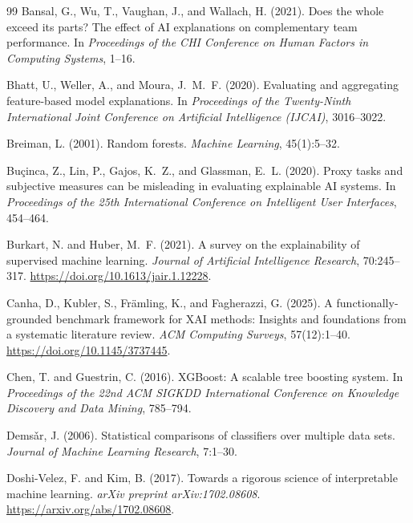 \documentclass[10pt]{article}
\begin{document}
\begin{thebibliography}{99}
Bansal, G., Wu, T., Vaughan, J., and Wallach, H. (2021).
Does the whole exceed its parts? The effect of AI explanations on
complementary team performance.
In \emph{Proceedings of the CHI Conference on Human Factors in Computing
Systems}, 1--16.

Bhatt, U., Weller, A., and Moura, J.~M.~F. (2020).
Evaluating and aggregating feature-based model explanations.
In \emph{Proceedings of the Twenty-Ninth International Joint Conference on
Artificial Intelligence (IJCAI)}, 3016--3022.

Breiman, L. (2001).
Random forests.
\emph{Machine Learning}, 45(1):5--32.

Bu\c{c}inca, Z., Lin, P., Gajos, K.~Z., and Glassman, E.~L. (2020).
Proxy tasks and subjective measures can be misleading in evaluating
explainable AI systems.
In \emph{Proceedings of the 25th International Conference on Intelligent
User Interfaces}, 454--464.

Burkart, N. and Huber, M.~F. (2021).
A survey on the explainability of supervised machine learning.
\emph{Journal of Artificial Intelligence Research}, 70:245--317.
\url{https://doi.org/10.1613/jair.1.12228}.

Canha, D., Kubler, S., Fr\"{a}mling, K., and Fagherazzi, G. (2025).
A functionally-grounded benchmark framework for XAI methods: Insights
and foundations from a systematic literature review.
\emph{ACM Computing Surveys}, 57(12):1--40.
\url{https://doi.org/10.1145/3737445}.

Chen, T. and Guestrin, C. (2016).
XGBoost: A scalable tree boosting system.
In \emph{Proceedings of the 22nd ACM SIGKDD International Conference on
Knowledge Discovery and Data Mining}, 785--794.

Dems\v{a}r, J. (2006).
Statistical comparisons of classifiers over multiple data sets.
\emph{Journal of Machine Learning Research}, 7:1--30.

Doshi-Velez, F. and Kim, B. (2017).
Towards a rigorous science of interpretable machine learning.
\emph{arXiv preprint arXiv:1702.08608}.
\url{https://arxiv.org/abs/1702.08608}.


\end{thebibliography}
\end{document}
